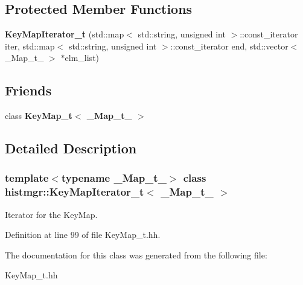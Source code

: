 \subsection*{Protected Member Functions}
\begin{DoxyCompactItemize}
\item 
{\bfseries KeyMapIterator\_\-t} (std::map$<$ std::string, unsigned int $>$::const\_\-iterator iter, std::map$<$ std::string, unsigned int $>$::const\_\-iterator end, std::vector$<$ \_\-Map\_\-t\_\- $>$ $\ast$elm\_\-list)\label{classhistmgr_1_1KeyMapIterator__t_a3612ff6f41ef33520d8bab59f38c4ed5}

\end{DoxyCompactItemize}
\subsection*{Friends}
\begin{DoxyCompactItemize}
\item 
class {\bfseries KeyMap\_\-t$<$ \_\-Map\_\-t\_\- $>$}\label{classhistmgr_1_1KeyMapIterator__t_a191ea493c1085e4505ff75fc2371f4fc}

\end{DoxyCompactItemize}


\subsection{Detailed Description}
\subsubsection*{template$<$typename \_\-Map\_\-t\_\-$>$ class histmgr::KeyMapIterator\_\-t$<$ \_\-Map\_\-t\_\- $>$}

Iterator for the KeyMap. 

Definition at line 99 of file KeyMap\_\-t.hh.

The documentation for this class was generated from the following file:\begin{DoxyCompactItemize}
\item 
KeyMap\_\-t.hh\end{DoxyCompactItemize}
